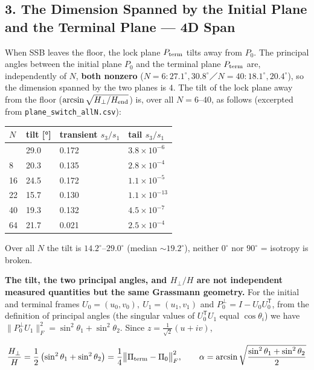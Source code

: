 \documentclass[
  a4paper,
]{ltjsarticle}
\newcounter{none} %
\begin{document}
\subsection{3. The Dimension Spanned by the Initial Plane and the
Terminal Plane --- 4D
Span}\label{the-dimension-spanned-by-the-initial-plane-and-the-terminal-plane-4d-span}

When SSB leaves the floor, the lock plane \(P_{\rm term}\) tilts away
from \(P_0\). The principal angles between the initial plane \(P_0\) and
the terminal plane \(P_{\rm term}\) are, independently of \(N\),
\textbf{both nonzero}
(\(N=6{:}27.1^\circ,30.8^\circ\)／\(N=40{:}18.1^\circ,20.4^\circ\)), so
the dimension spanned by the two planes is \(4\). The tilt of the lock
plane away from the floor (\(\arcsin\sqrt{H_\perp/H_{\rm end}}\)) is,
over all \(N=6\)--\(40\), as follows (excerpted from
\texttt{plane\_switch\_allN.csv}):

{\def\LTcaptype{none} %
\begin{longtable}[]{@{}llll@{}}
\toprule\noalign{}
\(N\) & tilt {[}°{]} & transient \(s_3/s_1\) & tail \(s_3/s_1\) \\
\midrule\noalign{}
\endhead
\bottomrule\noalign{}
\endlastfoot
6 & 29.0 & 0.172 & \(3.8\times10^{-6}\) \\
8 & 20.3 & 0.135 & \(2.8\times10^{-4}\) \\
16 & 24.5 & 0.172 & \(1.1\times10^{-5}\) \\
22 & 15.7 & 0.130 & \(1.1\times10^{-13}\) \\
40 & 19.3 & 0.132 & \(4.5\times10^{-7}\) \\
64 & 21.7 & 0.021 & \(2.5\times10^{-4}\) \\
\end{longtable}
}

Over all \(N\) the tilt is \(14.2^\circ\)--\(29.0^\circ\) (median
\(\sim19.2^\circ\)), neither \(0^\circ\) nor \(90^\circ\) = isotropy is
broken.

\textbf{The tilt, the two principal angles, and \(H_\perp/H\) are not
independent measured quantities but the same Grassmann geometry.} For
the initial and terminal frames \(U_0=(u_0,v_0),\ U_1=(u_1,v_1)\) and
\(P_0^\perp=I-U_0U_0^{\mathsf T}\), from the definition of principal
angles (the singular values of \(U_0^{\mathsf T}U_1\) equal
\(\cos\theta_i\)) we have
\(\|P_0^\perp U_1\|_F^2=\sin^2\theta_1+\sin^2\theta_2\). Since
\(z=\tfrac1{\sqrt2}(u+iv)\),

\[\frac{H_\perp}{H}=\frac12\left(\sin^2\theta_1+\sin^2\theta_2\right)=\frac14\big\|\Pi_{\rm term}-\Pi_0\big\|_F^2,\qquad \alpha=\arcsin\sqrt{\frac{\sin^2\theta_1+\sin^2\theta_2}{2}}\]
\end{document}
